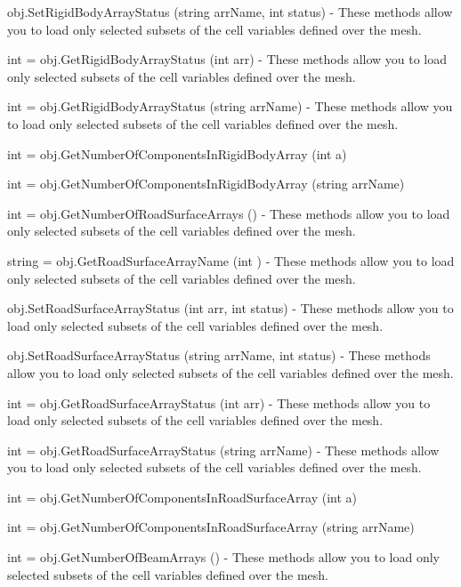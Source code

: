 \begin{DoxyItemize}
\item {\ttfamily obj.\-Set\-Rigid\-Body\-Array\-Status (string arr\-Name, int status)} -\/ These methods allow you to load only selected subsets of the cell variables defined over the mesh.  
\item {\ttfamily int = obj.\-Get\-Rigid\-Body\-Array\-Status (int arr)} -\/ These methods allow you to load only selected subsets of the cell variables defined over the mesh.  
\item {\ttfamily int = obj.\-Get\-Rigid\-Body\-Array\-Status (string arr\-Name)} -\/ These methods allow you to load only selected subsets of the cell variables defined over the mesh.  
\item {\ttfamily int = obj.\-Get\-Number\-Of\-Components\-In\-Rigid\-Body\-Array (int a)}  
\item {\ttfamily int = obj.\-Get\-Number\-Of\-Components\-In\-Rigid\-Body\-Array (string arr\-Name)}  
\item {\ttfamily int = obj.\-Get\-Number\-Of\-Road\-Surface\-Arrays ()} -\/ These methods allow you to load only selected subsets of the cell variables defined over the mesh.  
\item {\ttfamily string = obj.\-Get\-Road\-Surface\-Array\-Name (int )} -\/ These methods allow you to load only selected subsets of the cell variables defined over the mesh.  
\item {\ttfamily obj.\-Set\-Road\-Surface\-Array\-Status (int arr, int status)} -\/ These methods allow you to load only selected subsets of the cell variables defined over the mesh.  
\item {\ttfamily obj.\-Set\-Road\-Surface\-Array\-Status (string arr\-Name, int status)} -\/ These methods allow you to load only selected subsets of the cell variables defined over the mesh.  
\item {\ttfamily int = obj.\-Get\-Road\-Surface\-Array\-Status (int arr)} -\/ These methods allow you to load only selected subsets of the cell variables defined over the mesh.  
\item {\ttfamily int = obj.\-Get\-Road\-Surface\-Array\-Status (string arr\-Name)} -\/ These methods allow you to load only selected subsets of the cell variables defined over the mesh.  
\item {\ttfamily int = obj.\-Get\-Number\-Of\-Components\-In\-Road\-Surface\-Array (int a)}  
\item {\ttfamily int = obj.\-Get\-Number\-Of\-Components\-In\-Road\-Surface\-Array (string arr\-Name)}  
\item {\ttfamily int = obj.\-Get\-Number\-Of\-Beam\-Arrays ()} -\/ These methods allow you to load only selected subsets of the cell variables defined over the mesh.  

\end{DoxyItemize}
